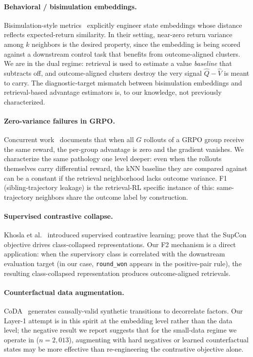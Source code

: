 \documentclass{article}
\begin{document}
\paragraph{Behavioral / bisimulation embeddings.} Bisimulation-style metrics~\cite{castro2020scalable,zhang2021learning,agarwal2021contrastive} explicitly engineer state embeddings whose distance reflects expected-return similarity. In their setting, near-zero return variance among $k$ neighbors is the desired property, since the embedding is being scored against a downstream control task that benefits from outcome-aligned clusters. We are in the dual regime: retrieval is used to estimate a value \emph{baseline} that subtracts off, and outcome-aligned clusters destroy the very signal $\hat{Q} - \hat{V}$ is meant to carry. The diagnostic-target mismatch between bisimulation embeddings and retrieval-based advantage estimators is, to our knowledge, not previously characterized.

\paragraph{Zero-variance failures in GRPO.} Concurrent work~\cite{zerovariance2025,ngrpo2025} documents that when all $G$ rollouts of a GRPO group receive the same reward, the per-group advantage is zero and the gradient vanishes. We characterize the same pathology one level deeper: even when the rollouts themselves carry differential reward, the kNN baseline they are compared against can be a constant if the retrieval neighborhood lacks outcome variance. F1 (sibling-trajectory leakage) is the retrieval-RL specific instance of this: same-trajectory neighbors share the outcome label by construction.

\paragraph{Supervised contrastive collapse.} Khosla et al.~\cite{khosla2020supervised} introduced supervised contrastive learning; \cite{graf2021dissecting} prove that the SupCon objective drives class-collapsed representations. Our F2 mechanism is a direct application: when the supervisory class is correlated with the downstream evaluation target (in our case, \texttt{round\_won} appears in the positive-pair rule), the resulting class-collapsed representation produces outcome-aligned retrievals.

\paragraph{Counterfactual data augmentation.} CoDA~\cite{pitis2020counterfactual} generates causally-valid synthetic transitions to decorrelate factors. Our Layer-1 attempt is in this spirit at the embedding level rather than the data level; the negative result we report suggests that for the small-data regime we operate in ($n{=}2{,}013$), augmenting with hard negatives or learned counterfactual states may be more effective than re-engineering the contrastive objective alone.
\end{document}
